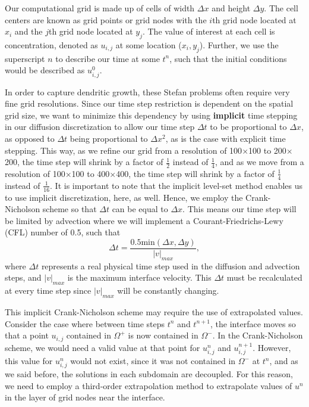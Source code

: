 \documentclass[oneside,12pt,final]{/Applications/TeX/packages/ucthesis-CA2012}
\begin{document}
\begin{mainmatter}
Our computational grid is made up of cells of width $\Delta x$ and height $\Delta y$. The cell centers are known as grid points or grid nodes with the $i$th grid node located at $x_i$ and the $j$th grid node located at $y_j$. The value of interest at each cell is concentration, denoted as $u_{i,j}$ at some location ($x_i,y_j$). Further, we use the superscript $n$ to describe our time at some $t^n$, such that the initial conditions would be described as $u_{i,j}^0$. 

In order to capture dendritic growth, these Stefan problems often require very fine grid resolutions. Since our time step restriction is dependent on the spatial grid size, we want to minimize this dependency by using \textbf{implicit} time stepping in our diffusion discretization to allow our time step $\Delta t$ to be proportional to $\Delta x$, as opposed to $\Delta t$ being proportional to $\Delta x^2$, as is the case with explicit time stepping. This way, as we refine our grid from a resolution of 100$\times$100 to 200$\times$200, the time step will shrink by a factor of $\frac{1}{2}$ instead of $\frac{1}{4}$, and as we move from a resolution of 100$\times$100 to 400$\times$400, the time step will shrink by a factor of $\frac{1}{4}$ instead of $\frac{1}{16}$. It is important to note that the implicit level-set method enables us to use implicit discretization, here, as well. Hence, we employ the Crank-Nicholson scheme so that $\Delta t$ can be equal to $\Delta x$. This means our time step will be limited by advection where we will implement a Courant-Friedrichs-Lewy (CFL) number of 0.5, such that
\begin{equation}\label{eqn:time_step_restriction_1}
\Delta t = \frac{0.5 \text{min} (\Delta x,\Delta y)}{|v|_{max}},
\end{equation}
where $\Delta t$ represents a real physical time step used in the diffusion and advection steps, and $|v|_{max}$ is the maximum interface velocity. This $\Delta t$ must be recalculated at every time step since $|v|_{max}$ will be constantly changing.

This implicit Crank-Nicholson scheme may require the use of extrapolated values. Consider the case where between time steps $t^n$ and $t^{n+1}$, the interface moves so that a point $u_{i,j}$ contained in $\Omega^+$ is now contained in $\Omega^-$. In the Crank-Nicholson scheme, we would need a valid value at that point for $u^n_{i,j}$ and $u^{n+1}_{i,j}$. However, this value for $u^n_{i,j}$ would not exist, since it was not contained in $\Omega^-$ at $t^n$, and as we said before, the solutions in each subdomain are decoupled. For this reason, we need to employ a third-order extrapolation method to extrapolate values of $u^n$ in the layer of grid nodes near the interface.


\end{mainmatter}
\end{document}
